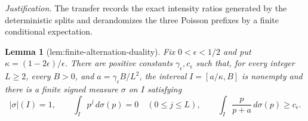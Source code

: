 \documentclass{article}
\newtheorem{lemma}{Lemma}
\begin{document}
\par\smallskip\noindent \textit{Justification.} The transfer records the exact intensity ratios generated by the deterministic splits and derandomizes the three Poisson prefixes by a finite conditional expectation.

\begin{lemma}[lem:finite-alternation-duality]\label{lem:finite-alternation-duality}
Fix \(0<\epsilon<1/2\) and put \(\kappa=(1-2\epsilon)/\epsilon\).  There are positive constants \(\gamma_\epsilon,c_\epsilon\) such that, for every integer \(L\ge2\), every \(B>0\), and \(a=\gamma_\epsilon B/L^2\), the interval \(I=[a/\kappa,B]\) is nonempty and there is a finite signed measure \(\sigma\) on \(I\) satisfying
\[
 |\sigma|(I)=1,\qquad \int_Ip^j\,d\sigma(p)=0\quad(0\le j\le L),
 \qquad \int_I\frac p{p+a}\,d\sigma(p)\ge c_\epsilon.
\]
\end{lemma}
\end{document}
